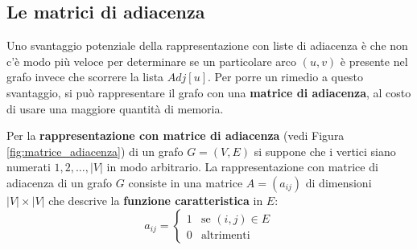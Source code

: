 \subsection{Le matrici di adiacenza}
Uno svantaggio potenziale della rappresentazione con liste di adiacenza è che non c'è modo più veloce per determinare se un particolare arco $(u,v)$ è presente nel grafo invece che scorrere la lista $Adj[u]$. Per porre un rimedio a questo svantaggio, si può rappresentare il grafo con una \textbf{matrice di adiacenza}, al costo di usare una maggiore quantità di memoria.

Per la \textbf{rappresentazione con matrice di adiacenza} (vedi Figura \ref{fig:matrice_adiacenza}) di un grafo $G=(V,E)$ si suppone che i vertici siano numerati $1,2,\ldots,|V|$ in modo arbitrario. La rappresentazione con matrice di adiacenza di un grafo $G$ consiste in una matrice $A=(a_{ij})$ di dimensioni $|V| \times |V|$ che descrive la \textbf{funzione caratteristica} in $E$:
\begin{equation}
	a_{ij} = \begin{cases}
		1 & \text{se } (i,j)\in E \\
		0 & \text{altrimenti}
	\end{cases}
\end{equation}

